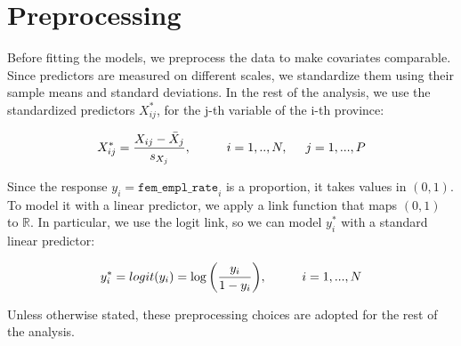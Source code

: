 \section{Preprocessing}
\label{sec:preprocessing}

Before fitting the models, we preprocess the data to make covariates comparable. Since predictors are measured on different scales, we standardize them using their sample means and standard deviations. In the rest of the analysis, we use the standardized predictors $X_{ij}^*$, for the j-th variable of the i-th province:

\begin{equation}
    X_{ij}^* = {{X_{ij} - \bar X_j} \over {s_{X_j}}}, \hspace{1cm} i = 1,..,N,  \hspace{0.5cm} j = 1,...,P
\end{equation}

Since the response $y_i = \texttt{fem\_empl\_rate}_i$ is a proportion, it takes values in $(0,1)$. To model it with a linear predictor, we apply a link function that maps $(0,1)$ to $\mathbb R$. In particular, we use the logit link, so we can model $y_i^*$ with a standard linear predictor:

\begin{equation}
    y_i^* = logit(y_i) = \log \bigg( {y_i \over {1 - y_i}} \bigg), \hspace{1cm} i = 1,...,N
\end{equation}

Unless otherwise stated, these preprocessing choices are adopted for the rest of the analysis.
